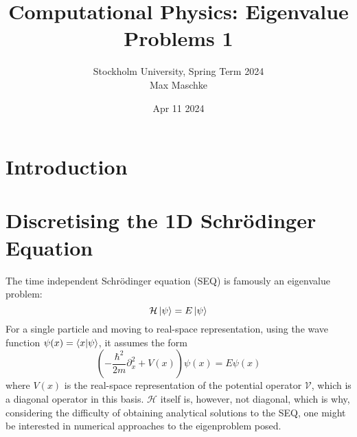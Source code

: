 \documentclass[a4paper,DIV=12,english]{scrartcl}
\title{Computational Physics: Eigenvalue Problems 1}
\author{Stockholm University, Spring Term 2024 \\Max Maschke}
\date{Apr 11 2024}
\begin{document}
\maketitle


\tableofcontents
\newpage


\newpage
\section{Introduction}
\cite{github}

\section{Discretising the 1D Schrödinger Equation}
The time independent Schrödinger equation (SEQ) is famously an eigenvalue problem: 
\begin{equation}\label{SEQ}
    \mathcal{H}\ket{\psi} = E\ket{\psi}
\end{equation}
For a single particle and moving to real-space representation, using the wave function $\psi(x) = \braket{x|\psi}$, it assumes the form 
\begin{equation}
    \left(-\frac{\hbar^2}{2m}\partial_x^2 + V(x)\right)\psi(x) = E\psi(x)
\end{equation}
where $V(x)$ is the real-space representation of the potential operator $\mathcal{V}$, which is a diagonal operator in this basis. $\mathcal{H}$ itself is, however, not diagonal, which is why, considering the difficulty of obtaining analytical solutions to the SEQ, one might be interested in numerical approaches to the eigenproblem posed.
\end{document}
